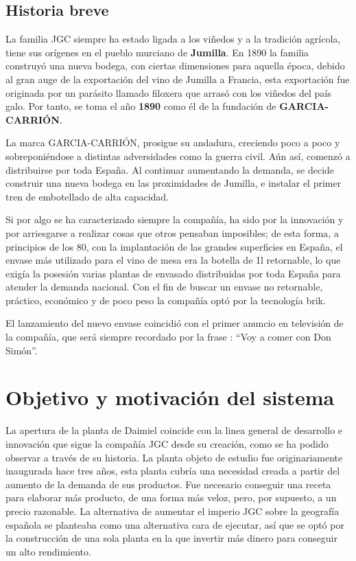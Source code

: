 \documentclass[11pt,a4paper,spanish,twoside]{report}
\begin{document}
\section{Historia breve}
La familia JGC siempre ha estado ligada a los viñedos y a la tradición
agrícola, tiene sus orígenes en el pueblo murciano de \textbf{Jumilla}. En 
1890 la familia construyó una nueva bodega, con ciertas dimensiones para 
aquella época, debido al gran auge de la exportación del vino de Jumilla a 
Francia, esta exportación fue originada por un parásito llamado filoxera que
arrasó con los viñedos del país galo. Por tanto, se toma el año \textbf{1890} 
como él de la fundación de \textbf{GARCIA-CARRIÓN}.

La marca GARCIA-CARRIÓN, prosigue su andadura, creciendo poco a poco y
sobreponiéndose a distintas adversidades como la guerra civil. Aún así,
comenzó a distribuirse por toda España. Al continuar aumentando la demanda, 
se decide construir una nueva bodega en las proximidades de Jumilla, e
instalar el primer tren de embotellado de alta capacidad.
 
Si por algo se ha caracterizado siempre la compañía, ha sido por la innovación
y por arriesgarse a realizar cosas que otros pensaban imposibles; de
esta forma, a principios de los 80, con la implantación de las grandes
superficies en España, el envase más utilizado para el vino de mesa era la
botella de 1l retornable, lo que exigía la posesión varias plantas de
envasado distribuidas por toda España para atender la demanda nacional. Con
el fin de buscar un envase no retornable, práctico, económico y de poco peso
la compañía optó por la tecnología brik.

El lanzamiento del nuevo envase coincidió con el primer anuncio en televisión
de la compañía, que será siempre recordado por la frase : ``Voy a comer con
Don Simón''.

\chapter{Objetivo y motivación del sistema}
La apertura de la planta de Daimiel coincide con la linea general de
desarrollo e innovación que sigue la compañía JGC desde su creación, como
se ha podido observar a través de su historia. La planta objeto de estudio fue
originariamente inaugurada hace tres años, esta planta cubría una necesidad
creada a partir del aumento de la demanda de sus productos. Fue necesario 
conseguir una receta para elaborar más producto, de una forma más veloz, pero,
por supuesto, a un precio razonable. La alternativa de aumentar el imperio JGC
sobre la geografía española se planteaba como una alternativa cara de ejecutar,
así que se optó por la construcción de una sola planta en la que invertir más 
dinero para conseguir un alto rendimiento.
\end{document}
